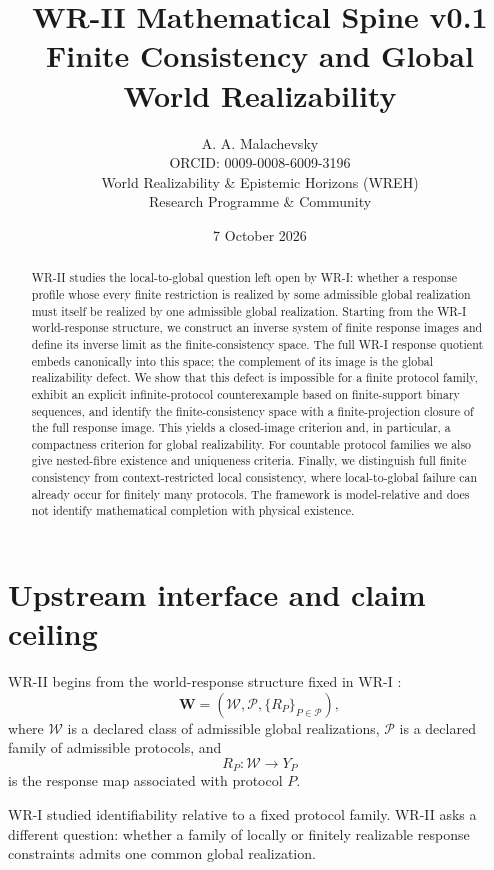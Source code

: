\documentclass[11pt]{article}
\title{\textbf{WR-II Mathematical Spine v0.1}\\[4pt]
\large Finite Consistency and Global World Realizability}
\author{A. A. Malachevsky\\
ORCID: 0009-0008-6009-3196\\
World Realizability \& Epistemic Horizons (WREH)\\
Research Programme \& Community}
\date{7 October 2026}
\newcommand{\W}{\mathcal W}
\newcommand{\Pcal}{\mathcal P}
\begin{document}
\maketitle

\begin{abstract}
WR-II studies the local-to-global question left open by WR-I: whether a response
profile whose every finite restriction is realized by some admissible global
realization must itself be realized by one admissible global realization.
Starting from the WR-I world-response structure, we construct an inverse system
of finite response images and define its inverse limit as the finite-consistency
space. The full WR-I response quotient embeds canonically into this space; the
complement of its image is the global realizability defect. We show that this
defect is impossible for a finite protocol family, exhibit an explicit
infinite-protocol counterexample based on finite-support binary sequences, and
identify the finite-consistency space with a finite-projection closure of the
full response image. This yields a closed-image criterion and, in particular,
a compactness criterion for global realizability. For countable protocol
families we also give nested-fibre existence and uniqueness criteria. Finally,
we distinguish full finite consistency from context-restricted local
consistency, where local-to-global failure can already occur for finitely many
protocols. The framework is model-relative and does not identify mathematical
completion with physical existence.
\end{abstract}

\section{Upstream interface and claim ceiling}

WR-II begins from the world-response structure fixed in WR-I
\cite{MalachevskyWRI}:
\[
\mathbf W=(\W,\Pcal,\{R_P\}_{P\in\Pcal}),
\]
where $\W$ is a declared class of admissible global realizations, $\Pcal$ is a
declared family of admissible protocols, and
\[
R_P:\W\to Y_P
\]
is the response map associated with protocol $P$.

WR-I studied identifiability relative to a fixed protocol family. WR-II asks a
different question: whether a family of locally or finitely realizable response
constraints admits one common global realization.
\end{document}
